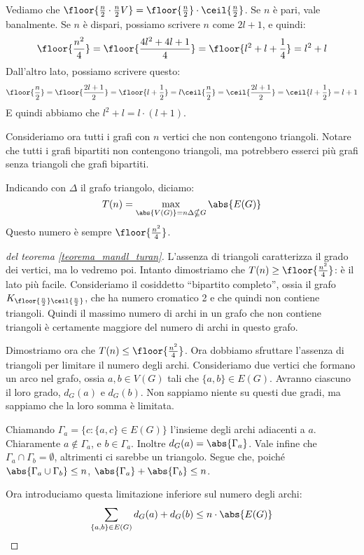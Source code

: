 Vediamo che $\floor{\frac{n}{2} \cdot \frac{n}{2}V} = \floor{\frac{n}{2}} \cdot \ceil{\frac{n}{2}}$.
Se $n$ \`e pari, vale banalmente.
Se $n$ \`e dispari, possiamo scrivere $n$ come $2 l + 1$, e quindi:
\[
	\floor{\frac{n^2}{4}} = \floor{\frac{4 l^2 + 4 l + 1}{4}} = 
	\floor{l^2 + l + \frac{1}{4}} = l^2 + l
\]
Dall'altro lato, possiamo scrivere questo:
\[
	\floor{\frac{n}{2}} = \floor{\frac{2 l + 1}{2}} = \floor{l + \frac{1}{2}} = l \\
	\ceil{\frac{n}{2}} = \ceil{\frac{2 l + 1}{2}} = \ceil{l + \frac{1}{2}} = l + 1
\]
E quindi abbiamo che $l^2 + l = l \cdot (l + 1)$.

Consideriamo ora tutti i grafi con $n$ vertici che non contengono triangoli.
Notare che tutti i grafi bipartiti non contengono triangoli, ma potrebbero esserci pi\`u grafi senza triangoli che grafi bipartiti.
\begin{theorem}
	\label{teorema_mandl_turan}
	Indicando con $\Delta$ il grafo triangolo, diciamo:
	\[
		T(n) = \max_{\abs{V(G)} = n \\ \Delta \nsubseteq G} \abs{E(G)}
	\]
	Questo numero \`e sempre $\floor{\frac{n^2}{4}}$.
\end{theorem}
\begin{proof}[del teorema \ref{teorema_mandl_turan}]
	L'assenza di triangoli caratterizza il grado dei vertici, ma lo vedremo poi.
	Intanto dimostriamo che $T(n) \ge \floor{\frac{n^2}{4}}$: \`e il lato pi\`u facile.
	Consideriamo il cosiddetto ``bipartito completo'', ossia il grafo $K_{\floor{\frac{n}{2}}\ceil{\frac{n}{2}}}$, che ha numero cromatico 2 e che quindi non contiene triangoli.
	Quindi il massimo numero di archi in un grafo che non contiene triangoli \`e certamente maggiore del numero di archi in questo grafo.

	Dimostriamo ora che $T(n) \le \floor{\frac{n^2}{4}}$.
	Ora dobbiamo sfruttare l'assenza di triangoli per limitare il numero degli archi.
	Consideriamo due vertici che formano un arco nel grafo, ossia $a,b \in V(G)$ tali che $\{a,b\} \in E(G)$.
	Avranno ciascuno il loro grado, $d_G(a)$ e $d_G(b)$.
	Non sappiamo niente su questi due gradi, ma sappiamo che la loro somma \`e limitata.

	Chiamando $\Gamma_a = \{ c : \{a,c\} \in E(G) \}$ l'insieme degli archi adiacenti a $a$.
	Chiaramente $a \notin \Gamma_a$, e $b \in \Gamma_a$.
	Inoltre $d_G(a) = \abs{\Gamma_a}$.
	Vale infine che $\Gamma_a \cap \Gamma_b = \emptyset$, altrimenti ci sarebbe un triangolo.
	Segue che, poich\'e $\abs{\Gamma_a \cup \Gamma_b} \le n$, $\abs{\Gamma_a} + \abs{\Gamma_b} \le n$.

	Ora introduciamo questa limitazione inferiore sul numero degli archi:
	\[
		\sum_{\{a,b\} \in E(G)} d_G(a) + d_G(b) \le n \cdot \abs{E(G)}
	\]

\end{proof}

